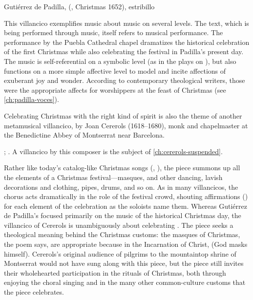 {Gutiérrez de Padilla, 
(, Christmas 1652), estribillo}

This villancico exemplifies music about music on several levels.
The text, which is being performed through music, itself refers to musical
performance.
The performance by the Puebla Cathedral chapel dramatizes the historical
celebration of the first Christmas while also celebrating the festival in
Padilla's present day.  
The music is self-referential on a symbolic level (as in the plays on
), but also functions on a more simple affective level to model and
incite affections of exuberant joy and wonder.
According to contemporary theological writers, those were the appropriate
affects for worshippers at the feast of Christmas (see
\cref{ch:padilla-voces}).

Celebrating Christmas with the right kind of spirit is also the theme of
another metamusical villancico,  by Joan
Cererols (1618--1680), monk and chapelmaster at the Benedictine Abbey of
Montserrat near Barcelona.%
\begin{Footnote}
    ; \autocite[81--94]{Cererols:MEM-VC}.
    A villancico by this composer is the subject of
    \cref{ch:cererols-suspended}.
\end{Footnote}
Rather like today's catalog-like Christmas songs (,
), the piece summons up all the
elements of a Christmas festival---masques,  and other
dancing, lavish decorations and clothing, pipes, drums, and so on.
As in many villancicos, the chorus acts dramatically in the role of the
festival crowd, shouting affirmations () for each element of
the celebration as the soloists name them.  
Whereas Gutiérrez de Padilla's  focused
primarily on the music of the historical Christmas day, the villancico of
Cererols is unambiguously about celebrating .
The piece seeks a theological meaning behind the Christmas customs: the masques
of Christmas, the poem says, are appropriate because in the Incarnation of
Christ,  (God masks himself).
Cererols's original audience of pilgrims to the mountaintop shrine of
Montserrat would not have sung along with this piece, but the piece still
invites their wholehearted participation in the rituals of Christmas, both
through enjoying the choral singing and in the many other common-culture
customs that the piece celebrates.

